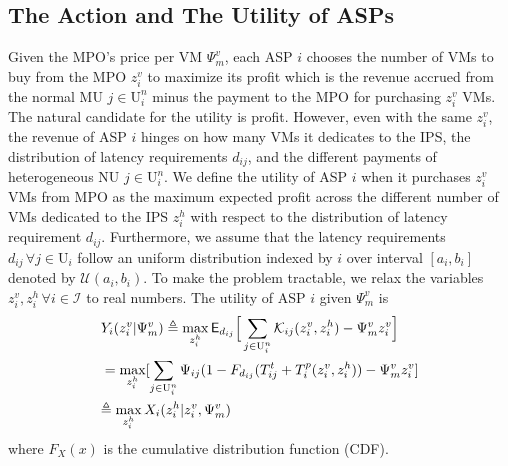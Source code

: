 \documentclass[10pt,journal, compsoc]{IEEEtran}
\begin{document}
\subsection{The Action and The Utility of ASPs}
Given the MPO's price per VM $\Psi_m^v$, each ASP $i$ chooses the number of VMs to buy from the MPO $z_i^v$ to maximize its profit which is the revenue accrued from the normal MU $j \in \mathrm{U}_i^n$ minus the payment to the MPO for purchasing $z_i^v$ VMs. The natural candidate for the utility is profit. However, even with the same $z_i^v$, the revenue of ASP $i$ hinges on how many VMs it dedicates to the IPS, the distribution of latency requirements $d_{ij}$, and the different payments of heterogeneous NU $j \in \mathrm{U}_i^n$. We define the utility of ASP $i$ when it purchases $z_i^v$ VMs from MPO as the maximum expected profit across the different number of VMs dedicated to the IPS $z_i^h$ with respect to the distribution of latency requirement $d_{ij}$. Furthermore, we assume that the latency requirements $d_{ij} \, \forall j \in \mathrm{U}_i$ follow an uniform distribution indexed by $i$ over interval $[a_i, b_i]$ denoted by $\mathcal{U}(a_i,b_i)$. To make the problem tractable, we relax the variables $z_i^v, z_i^h \, \forall i \in \mathcal{I}$ to real numbers. The utility of ASP $i$ given $\Psi_m^v$ is
\begin{align}
&Y_i(z_i^v|\Psi_m^v) \triangleq \max_{z_i^h} \mathsf{E}_{d_{ij}}\Big[\sum_{j \in \mathrm{U}_i^n} \mathcal{K}_{ij}(z_i^v, z_i^h) - \Psi_m^v z_i^v\Big] 
\hspace*{-1mm}
\iffalse=\max_{z_i^h} \mathsf{E}_{d_{ij}}[\sum_{j \in \mathrm{U}_i^n}\Psi_{ij}\mathds{1}\{T_{ij}^t + T_i^p(z_i^v, z_i^h) \leq d_{ij}\} - \Psi_m^vz_i^v] \nonumber \fi\\
\hspace*{-1mm}&=\max_{z_i^h} [\sum_{j \in \mathrm{U}_i^n}\Psi_{ij}(1-F_{d_{ij}}(T_{ij}^t+T_i^p(z_i^v, z_i^h)) - \Psi_m^vz_i^v] \\ %
&\hspace*{-1mm}\triangleq \max_{z_i^h} X_i(z_i^h|z_i^v,\Psi_m^v) \label{eqn:asp_def_subobjective}
\end{align}
where $F_{X}(x)$ is the cumulative distribution function (CDF).
\end{document}
